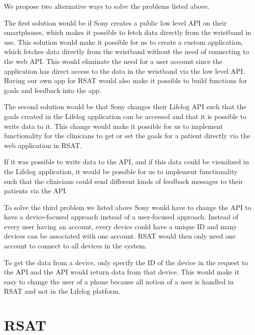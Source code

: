 \documentclass{cslthse-msc}
\begin{document}
We propose two alternative ways to solve the problems listed above. 

The first solution would be if Sony creates a public low level API on their smartphones, which makes it possible to fetch data directly from the wristband in use. This solution would make it possible for us to create a custom application, which fetches data directly from the wristband without the need of connecting to the web API. This would eliminate the need for a user account since the application has direct access to the data in the wristband via the low level API. Having our own app for RSAT would also make it possible to build functions for goals and feedback into the app.

The second solution would be that Sony changes their Lifelog API such that the goals created in the Lifelog application can be accessed and that it is possible to write data to it. This change would make it possible for us to implement functionality for the clinicians to get or set the goals for a patient directly via the web application in RSAT. 

If it was possible to write data to the API, and if this data could be visualized in the Lifelog application, it would be possible for us to implement functionality such that the clinicians could send different kinds of feedback messages to their patients via the API. 

To solve the third problem we listed above Sony would have to change the API to have a device-focused approach instead of a user-focused approach. Instead of every user having an account, every device could have a unique ID and many devices can be associated with one account. RSAT would then only need one account to connect to all devices in the system. 

To get the data from a device, only specify the ID of the device in the request to the API and the API would return data from that device. This would make it easy to change the user of a phone because all notion of a user is handled in RSAT and not in the Lifelog platform. 





\section{RSAT}
\end{document}
